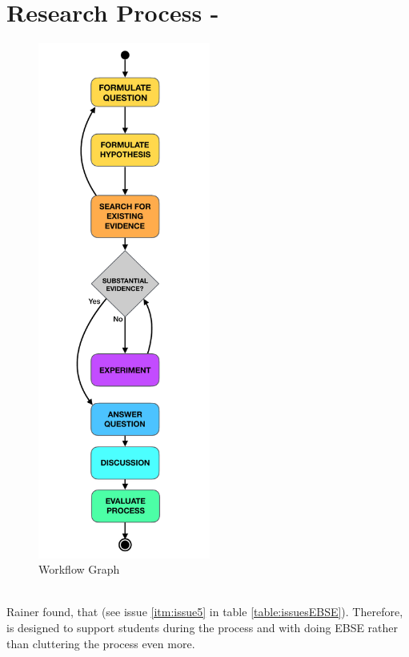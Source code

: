 
\section{Research Process - \checklist}
\label{sec:research process}

\begin{minipage}{\linewidth}
\begin{figure}
	\centering
	\vspace{1cm}
	\includegraphics[trim={3cm 0 3cm 0}, height=17cm]{figures/workflow_graph.pdf}
	\caption{Workflow Graph}
	\label{fig:workflow_graph}
\end{figure}



\\
Rainer \etal found, that \cite{Rainer2006} (see issue \ref{itm:issue5} in table \ref{table:issuesEBSE}). Therefore, \checklist is designed to support students during the process and with doing  EBSE rather than cluttering the process even more.


\end{minipage}

